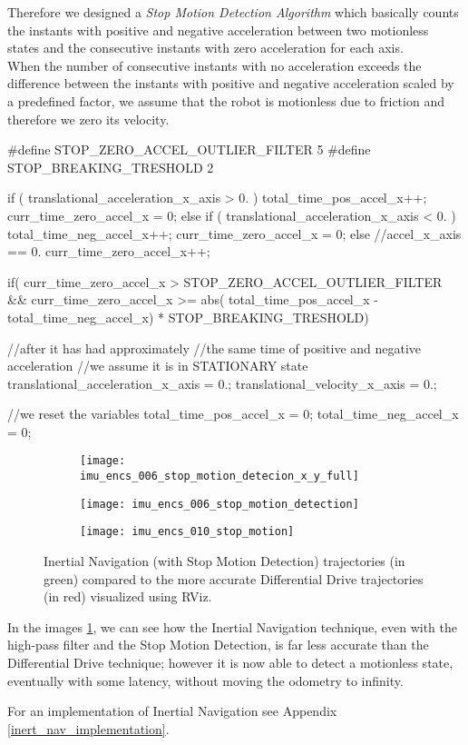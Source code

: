 Therefore we designed a \textit{Stop Motion Detection Algorithm} which basically counts the instants with positive and negative acceleration between two motionless states and the consecutive instants with zero acceleration for each axis.\\
When the number of consecutive instants with no acceleration exceeds the difference between the instants with positive and negative acceleration scaled by a predefined factor, we assume that the robot is motionless due to friction and therefore we zero its velocity.\\
\begin{ccode}
	#define STOP_ZERO_ACCEL_OUTLIER_FILTER 5
	#define STOP_BREAKING_TRESHOLD 2

	if ( translational_acceleration_x_axis > 0. ) {
		total_time_pos_accel_x++;
		curr_time_zero_accel_x = 0;
	} else if ( translational_acceleration_x_axis < 0. ) {
		total_time_neg_accel_x++;
		curr_time_zero_accel_x = 0;
	} else //accel_x_axis == 0.
		curr_time_zero_accel_x++;	
	
	if( curr_time_zero_accel_x > STOP_ZERO_ACCEL_OUTLIER_FILTER &&
			curr_time_zero_accel_x >= abs( total_time_pos_accel_x - total_time_neg_accel_x) * STOP_BREAKING_TRESHOLD) {
		//after it has had approximately
			//the same time of positive and negative acceleration
			//we assume it is in STATIONARY state
		translational_acceleration_x_axis = 0.;
		translational_velocity_x_axis = 0.;
		
		//we reset the variables
		total_time_pos_accel_x = 0;
		total_time_neg_accel_x = 0;
	}
\end{ccode}


\begin{figure}[htb]
 \centering
	\begin{subfigure}{0.3\textwidth}
		\texttt{[image: imu\_encs\_006\_stop\_motion\_detecion\_x\_y\_full]}
	\end{subfigure}\hfil
	\begin{subfigure}{0.3\textwidth}
		\texttt{[image: imu\_encs\_006\_stop\_motion\_detection]}
	\end{subfigure}\hfil
	\begin{subfigure}{0.3\textwidth}
		\texttt{[image: imu\_encs\_010\_stop\_motion]}
	\end{subfigure}
	\captionsetup{justification=centering, margin=1.5cm}
	\caption{Inertial Navigation (with Stop Motion Detection) trajectories (in green) compared to the more accurate Differential Drive trajectories (in red) visualized using RViz.}
	\label{stop_motion_fig}
\end{figure}
In the images \ref{stop_motion_fig}, we can see how the Inertial Navigation technique, even with the high-pass filter and the Stop Motion Detection, is far less accurate than the Differential Drive technique; however it is now able to detect a motionless state, eventually with some latency, without moving the odometry to infinity.

For an implementation of Inertial Navigation see Appendix \ref{inert_nav_implementation}.
